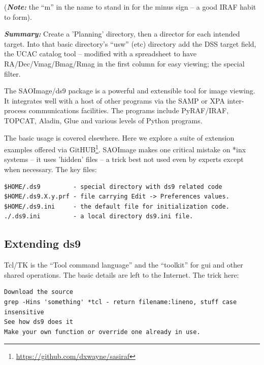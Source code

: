(\textbf{\emph{Note:}} the ``m'' in the name to stand in for the minus sign -- a good
IRAF habit to form).

\textbf{\emph{Summary:}} Create a 'Planning' directory, then a director for each intended
target. Into that basic directory's ``usw'' (etc) directory add the
DSS target field, the UCAC catalog tool -- modified with a spreadsheet
to have RA/Dec/Vmag/Bmag/Rmag in the first column for easy viewing;
the special filter.

The SAOImage/ds9 package is a powerful and extensible tool for image
viewing.  It integrates well with a host of other programs via the
SAMP or XPA inter-process communications facilities. The programs
include PyRAF/IRAF, TOPCAT, Aladin, Glue and various levels of Python
programs.

The basic usage is covered elsewhere. Here we explore a suite of extension
examples offered via GitHUB\footnote{\url{https://github.com/dxwayne/sasiraf}}.
SAOImage makes one critical mistake on *inx systems -- it uses 'hidden'
files -- a trick best not used even by experts except when necessary.
The key files:

\begingroup \fontsize{10pt}{10pt}
\selectfont
\begin{verbatim} 
$HOME/.ds9         - special directory with ds9 related code
$HOME/.ds9.X.y.prf - file carrying Edit -> Preferences values.
$HOME/.ds9.ini     - the default file for initialization code.
./.ds9.ini         - a local directory ds9.ini file.
\end{verbatim}
\endgroup

\subsection{Extending ds9}

Tcl/TK is the ``Tool command language'' and the ``toolkit'' for gui and
other shared operations. The basic details are left to the Internet.
The trick here:

\begingroup \fontsize{10pt}{10pt}
\selectfont
\begin{verbatim} 
Download the source
grep -Hins 'something' *tcl - return filename:lineno, stuff case insensitive
See how ds9 does it
Make your own function or override one already in use.
\end{verbatim}
\endgroup

